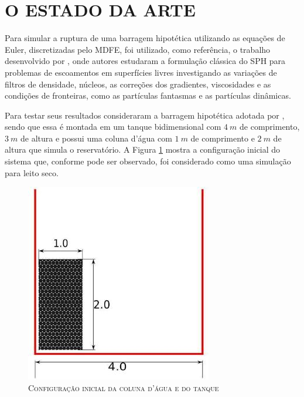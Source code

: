 \section{O ESTADO DA ARTE} \label{arte}

Para simular a ruptura de uma barragem hipotética utilizando as equações de Euler, discretizadas pelo MDFE, foi utilizado, como referência, o trabalho desenvolvido por , onde autores estudaram a formulação clássica do SPH para problemas de escoamentos em superfícies livres investigando as variações de filtros de densidade, núcleos, as correções dos gradientes, viscosidades e as condições de fronteiras, como as partículas fantasmas e as partículas dinâmicas. 

Para testar seus resultados consideraram a barragem hipotética adotada por , sendo que essa é montada em um tanque bidimensional com $4 \ m$ de comprimento, $3 \ m $ de altura e possui uma coluna d'água com $1 \ m$ de comprimento e $2 \ m$ de altura que simula o reservatório. A Figura \ref{fig:tanque} mostra a configuração inicial do sistema que, conforme pode ser observado, foi considerado como uma simulação para leito seco.

\begin{figure}[H]
\centering
\includegraphics[scale=1]{figuras/tanque.jpg}
\caption{\textsc{Configuração inicial da coluna d'água e do tanque}}
\vspace{-0.1cm}
\label{fig:tanque}
\end{figure}


